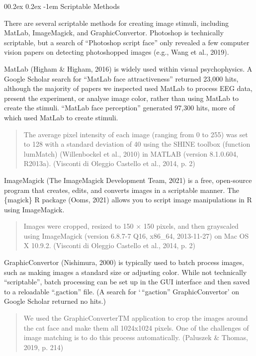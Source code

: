 \documentclass[
  doc,floatsintext]{apa6}
\makeatletter
\let\oldparagraph\paragraph
\renewcommand{\paragraph}[1]{\oldparagraph{#1}\mbox{}}
\renewcommand{\paragraph}{\@startsection{paragraph}{4}{\parindent}%
  {0\baselineskip \@plus 0.2ex \@minus 0.2ex}%
  {-1em}%
  {\normalfont\normalsize\bfseries\itshape\typesectitle}}
\makeatother
\begin{document}
\hypertarget{scriptable-methods}{%
\paragraph{Scriptable Methods}\label{scriptable-methods}}

There are several scriptable methods for creating image stimuli, including MatLab, ImageMagick, and GraphicConvertor. Photoshop is technically scriptable, but a search of ``Photoshop script face'' only revealed a few computer vision papers on detecting photoshopped images (e.g., Wang et al., 2019).

MatLab (Higham \& Higham, 2016) is widely used within visual psychophysics. A Google Scholar search for ``MatLab face attractiveness'' returned 23,000 hits, although the majority of papers we inspected used MatLab to process EEG data, present the experiment, or analyse image color, rather than using MatLab to create the stimuli. ``MatLab face perception'' generated 97,300 hits, more of which used MatLab to create stimuli.

\begin{quote}
The average pixel intensity of each image (ranging from 0 to 255) was set to 128 with a standard deviation of 40 using the SHINE toolbox (function lumMatch) (Willenbockel et al., 2010) in MATLAB (version 8.1.0.604, R2013a). (Visconti di Oleggio Castello et al., 2014, p. 2)
\end{quote}

ImageMagick (The ImageMagick Development Team, 2021) is a free, open-source program that creates, edits, and converts images in a scriptable manner. The \{magick\} R package (Ooms, 2021) allows you to script image manipulations in R using ImageMagick.

\begin{quote}
Images were cropped, resized to 150 × 150 pixels, and then grayscaled using ImageMagick (version 6.8.7-7 Q16, x86\_64, 2013-11-27) on Mac OS X 10.9.2. (Visconti di Oleggio Castello et al., 2014, p. 2)
\end{quote}

GraphicConvertor (Nishimura, 2000) is typically used to batch process images, such as making images a standard size or adjusting color. While not technically ``scriptable'', batch processing can be set up in the GUI interface and then saved to a reloadable ``.gaction'' file. (A search for `\,``gaction'' GraphicConvertor' on Google Scholar returned no hits.)

\begin{quote}
We used the GraphicConverterTM application to crop the images around the cat face and make them all 1024x1024 pixels. One of the challenges of image matching is to do this process automatically. (Paluszek \& Thomas, 2019, p. 214)
\end{quote}
\end{document}
